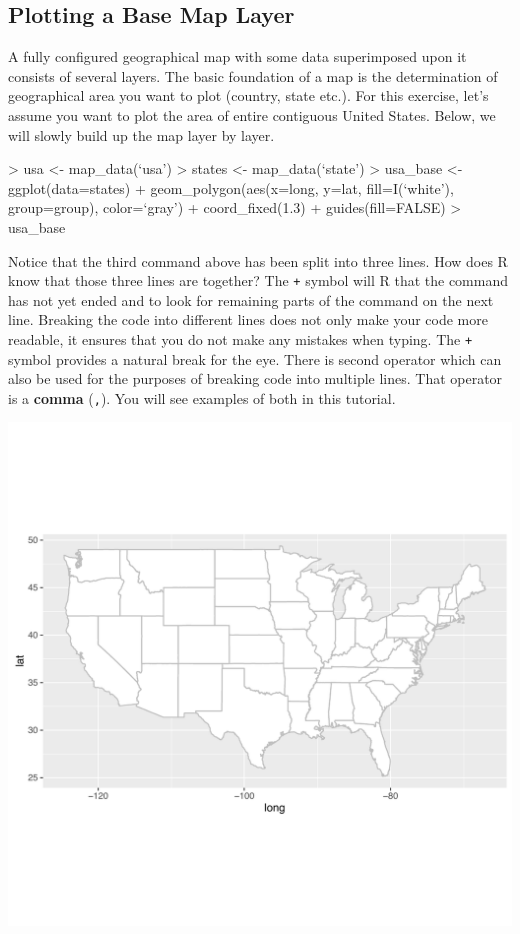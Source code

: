 \documentclass[11pt,twosided]{article}
\begin{document}
\subsection{Plotting a Base Map Layer}
A fully configured geographical map with some data superimposed upon it consists of several layers.  The basic foundation of a map is the determination of geographical area you want to plot (country, state etc.).  For this exercise, let's assume you want to plot the area of entire contiguous United States.  Below, we will slowly build up the map layer by layer.\\

\begin{tcolorbox}[breakable,boxrule=0.5pt,enhanced]
\begin{code}

> usa <- map_data(`usa')
> states <- map_data(`state')
> usa_base <- ggplot(data=states) + 
	geom_polygon(aes(x=long, y=lat, fill=I(`white'), group=group), color=`gray') + 
	coord_fixed(1.3) + guides(fill=FALSE) 
> usa_base
\end{code}
\end{tcolorbox}
\vspace{2ex}

Notice that the third command above has been split into three lines.  How does R know that those three lines are together?  The {\tt +} symbol will R that the command has not yet ended and to look for remaining parts of the command on the next line.  Breaking the code into different lines does not only make your code more readable, it ensures that you do not make any mistakes when typing.  The {\tt +} symbol provides a natural break for the eye.  There is second operator which can also be used for the purposes of breaking code into multiple lines.  That operator is a {\bf comma} ({\tt ,}).  You will see examples of both in this tutorial.\\

\begin{center}
\includegraphics[width=6.5in]{usa_base}
\end{center}
\end{document}

